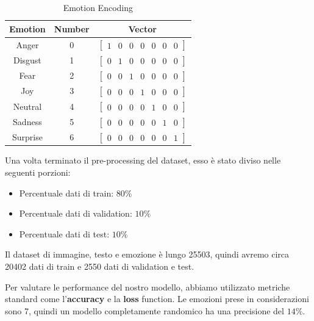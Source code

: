 \documentclass{article}
\begin{document}
\bigskip

\begin{table}[!h]
\centering
\begin{tabular}{|c|c|c|}
\hline
Emotion & Number & Vector \\
\hline
Anger & 0 & $\begin{bmatrix} 1 & 0 & 0 & 0 & 0 & 0 & 0 \end{bmatrix}$ \\
Disgust & 1 & $\begin{bmatrix} 0 & 1 & 0 & 0 & 0 & 0 & 0 \end{bmatrix}$ \\
Fear & 2 & $\begin{bmatrix} 0 & 0 & 1 & 0 & 0 & 0 & 0 \end{bmatrix}$ \\
Joy & 3 & $\begin{bmatrix} 0 & 0 & 0 & 1 & 0 & 0 & 0 \end{bmatrix}$ \\
Neutral & 4 & $\begin{bmatrix} 0 & 0 & 0 & 0 & 1 & 0 & 0 \end{bmatrix}$ \\
Sadness & 5 & $\begin{bmatrix} 0 & 0 & 0 & 0 & 0 & 1 & 0 \end{bmatrix}$ \\
Surprise & 6 & $\begin{bmatrix} 0 & 0 & 0 & 0 & 0 & 0 & 1 \end{bmatrix}$ \\
\hline
\end{tabular}
\caption{Emotion Encoding}
\label{tab:emotion_encoding}
\end{table}


Una volta terminato il pre-processing del dataset, esso è stato diviso nelle seguenti porzioni:
\begin{itemize}
    \item Percentuale dati di train: $80\%$
    \item Percentuale dati di validation: $10\%$
    \item Percentuale dati di test: $10\%$
\end{itemize}
Il dataset di immagine, testo e emozione è lungo 25503, quindi avremo circa 20402 dati di train e 2550 dati di validation e test.

\bigskip

Per valutare le performance del nostro modello, abbiamo utilizzato metriche standard come l'\textbf{accuracy} e la \textbf{loss} function. Le emozioni prese in considerazioni sono 7, quindi un modello completamente randomico ha una precisione del $14\%$.
\end{document}
